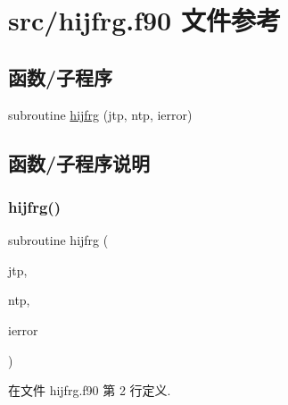 \hypertarget{hijfrg_8f90}{}\section{src/hijfrg.f90 文件参考}
\label{hijfrg_8f90}
\subsection*{函数/子程序}
\begin{DoxyCompactItemize}
\item 
subroutine \mbox{\hyperlink{hijfrg_8f90_a7465486594ae3fa0b96020635449d731}{hijfrg}} (jtp, ntp, ierror)
\end{DoxyCompactItemize}


\subsection{函数/子程序说明}
\mbox{\label{hijfrg_8f90_a7465486594ae3fa0b96020635449d731}} 
\subsubsection{\texorpdfstring{hijfrg()}{hijfrg()}}
{\footnotesize\ttfamily subroutine hijfrg (\begin{DoxyParamCaption}\item[{}]{jtp,  }\item[{}]{ntp,  }\item[{}]{ierror }\end{DoxyParamCaption})}



在文件 hijfrg.\+f90 第 2 行定义.

